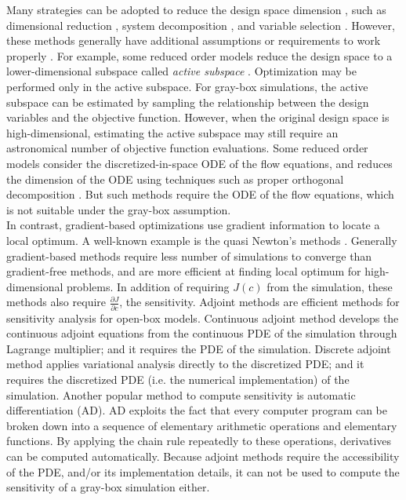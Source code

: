 \documentclass[a4paper,onecolumn]{article}
\theoremstyle{remark}
\begin{document}
\noindent Many strategies can be adopted to reduce the design space dimension 
\cite{survey of high dimensional blackbox optimization}, such as
dimensional reduction \cite{dimensional reduction}, system decomposition \cite{decomposition},
and variable selection \cite{variable selection}. However, these methods generally have 
additional assumptions or requirements to work properly \cite{survey of high dimensional blackbox 
optimization}. For example, some reduced order models reduce the design space
to a lower-dimensional subspace called \emph{active subspace} \cite{Han AIAA, Active subspace}.
Optimization may be performed only in the active subspace. 
For gray-box simulations, the active subspace can be estimated 
by sampling the relationship between the design variables and the objective function.  
However, when the original design space is high-dimensional, estimating the active subspace 
may still require an astronomical number of objective function evaluations. 
Some reduced order models consider the discretized-in-space ODE of the flow equations,
and reduces the dimension of the ODE using techniques such as proper 
orthogonal decomposition \cite{Balanced truncation}. But such methods require 
the ODE of the flow equations, which is not suitable under the gray-box assumption.\\

\noindent In contrast, gradient-based optimizations use gradient information to locate a local optimum.
A well-known example is the quasi Newton's methods \cite{quasiNewton}. 
Generally gradient-based methods require less number of simulations 
to converge than gradient-free methods, and are more efficient at finding local optimum for high-dimensional problems.
In addition of requiring $J(c)$ from the simulation,
these methods also require $\frac{\partial J}{\partial c}$, the sensitivity.
Adjoint methods are efficient methods for sensitivity analysis\cite{cont discretize adjoint}
for open-box models.
Continuous adjoint method develops the continuous adjoint equations from the continuous PDE of the simulation through 
Lagrange multiplier; and it requires the PDE of the simulation. 
Discrete adjoint method applies variational analysis directly to the discretized PDE; and it requires the
discretized PDE (i.e. the numerical implementation) of the simulation.
Another popular method to compute sensitivity is automatic differentiation (AD)\cite{automaticdiff}.
AD exploits the fact that every computer program can be broken down into a sequence of elementary arithmetic operations
and elementary functions. By applying the chain rule repeatedly to these operations, 
derivatives can be computed automatically. Because adjoint methods require
the accessibility of the PDE, and/or its implementation details, 
it can not be used to compute the sensitivity of a gray-box simulation either.\\
\end{document}
